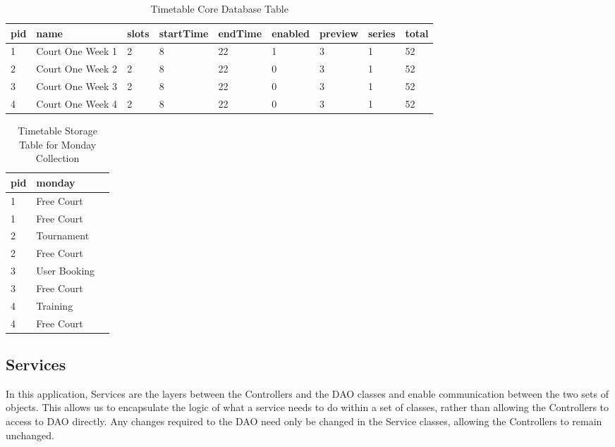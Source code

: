 \begin{table}
    \begin{tabular}{| l | l | l | l | l | l | l | l | p{.8cm} |}
    \hline
    pid & name & slots & startTime & endTime & enabled & preview & series & total\\ \hline
    1 & Court One Week 1 & 2 & 8 & 22 & 1 & 3 & 1 & 52\\ \hline
	2 & Court One Week 2 & 2 & 8 & 22 & 0 & 3 & 1 & 52\\ \hline
	3 & Court One Week 3 & 2 & 8 & 22 & 0 & 3 & 1 & 52\\ \hline
	4 & Court One Week 4 & 2 & 8 & 22 & 0 & 3 & 1 & 52\\ \hline
    \end{tabular}
	\caption{Timetable Core Database Table}
\end{table}

\begin{table}
\begin {center}
    \begin{tabular}{| l | l | p{.8cm} |}
	\hline
	pid & monday \\ \hline
	1 & Free Court \\ \hline
	1 & Free Court \\ \hline
	2 & Tournament \\ \hline
	2 & Free Court \\ \hline
	3 & User Booking \\ \hline
	3 & Free Court \\ \hline
	4 & Training \\ \hline
	4 & Free Court \\ \hline
	\end{tabular}
	\end{center}
	\caption{Timetable Storage Table for Monday Collection}
\end{table}



\subsection{Services}

In this application, Services are the layers between the Controllers and the DAO classes and enable communication between the two sets of objects. This allows us to encapsulate the logic of what a service needs to do within a set of classes, rather than allowing the Controllers to access to DAO directly. Any changes required to the DAO need only be changed in the Service classes, allowing the Controllers to remain unchanged. 

